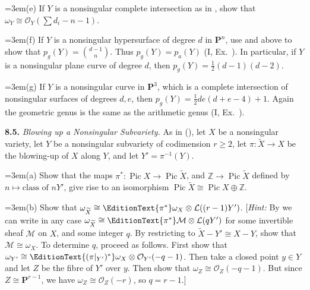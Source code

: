{\noindent\hangindent=3em\hspace*{1.7em}\hypertarget{ex-II-8.4-e}{}(e) If $Y$ is a nonsingular complete intersection as in , show that $\omega_Y\cong\mathcal O_Y(\sum d_i-n-1)$.

\noindent\hangindent=3em\hspace*{1.7em}\hypertarget{ex-II-8.4f}{}(f) If $Y$ is a nonsingular hypersurface of degree $d$ in $\mathbf P^n$, use  and  above to show that $p_g(Y)=\binom{d-1}{n}$. Thus $p_g(Y)=p_a(Y)$ (I, Ex.~). In particular, if $Y$ is a nonsingular plane curve of degree $d$, then $p_g(Y)=\frac12(d-1)(d-2)$.

\noindent\hangindent=3em\hspace*{1.7em}(g) If $Y$ is a nonsingular curve in $\mathbf P^3$, which is a complete intersection of nonsingular surfaces of degrees $d,e$, then $p_g(Y)=\frac12de(d+e-4)+1$. Again the geometric genus is the same as the arithmetic genus (I, Ex.~).

\smallskip
\noindent\hypertarget{ex-II-8.5}{}\textbf{8.5.} \emph{Blowing up a Nonsingular Subvariety.} As in (), let $X$ be a nonsingular variety, let $Y$ be a nonsingular subvariety of codimension $r\ge2$, let $\pi\colon\widetilde X\to X$ be the blowing-up of $X$ along $Y$, and let $Y'=\pi^{-1}(Y)$.

\noindent\hangindent=3em\hspace*{1.7em}\hypertarget{ex-II-8.5-a}{}(a) Show that the maps $\pi^*\colon\operatorname{Pic} X\to\operatorname{Pic}\widetilde X$, and $\mathbb Z\to\operatorname{Pic}\widetilde X$ defined by $n\mapsto\text{class of }nY'$, give rise to an isomorphism $\operatorname{Pic}\widetilde X\cong\operatorname{Pic} X\oplus\mathbb Z$.

\noindent\hangindent=3em\hspace*{1.7em}(b) Show that $\omega_{\widetilde X}\cong\EditionText{\pi^*}\omega_X\otimes\mathcal L((r-1)Y')$. [\emph{Hint:} By  we can write in any case $\omega_{\widetilde X}\cong\EditionText{\pi^*}\mathcal M\otimes\mathcal L(qY')$ for some invertible sheaf $\mathcal M$ on $X$, and some integer $q$. By restricting to $\widetilde X-Y'\cong X-Y$, show that $\mathcal M\cong\omega_X$. To determine $q$, proceed as follows. First show that $\omega_{Y'}\cong\EditionText{(\pi|_{Y'})^*}\omega_X\otimes\mathcal O_{Y'}(-q-1)$. Then take a closed point $y\in Y$ and let $Z$ be the fibre of $Y'$ over $y$. Then show that $\omega_Z\cong\mathcal O_Z(-q-1)$. But since $Z\cong\mathbf P^{r-1}$, we have $\omega_Z\cong\mathcal O_Z(-r)$, so $q=r-1$.]

}
